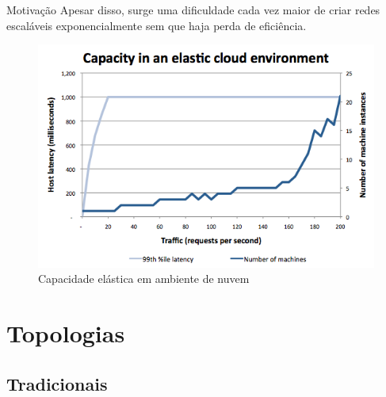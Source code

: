 \documentclass[aspectratio=169]{beamer}
\newcommand*\setcaptioncitation[1]{\def\captioncitation{\textit{Source:}~#1}}
\let\captioncitation\relax
\begin{document}
        \begin{frame} {Motivação}
            \centering
            \Large
            Apesar disso, surge uma dificuldade cada vez maior de criar redes escaláveis exponencialmente sem que haja perda de eficiência.
            \begin{figure}[ht]    
                            \includegraphics[scale=0.35]{capacity.png}
                             \setcaptioncitation{  \href{http://www.bitcurrent.com/the-clouds-most-important-equation/}{http://www.bitcurrent.com/the-clouds-most-important-equation/}}
                             \caption{Capacidade elástica em ambiente de nuvem}
                    
                            \label{fig:capacity}
                        \end{figure}
        \end{frame} 
            
        
\section{Topologias} 
    
    \subsection{Tradicionais}
    
\end{document}
